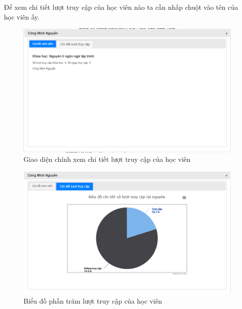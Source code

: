 \newpage
Để xem chi tiết lượt truy cập của học viên nào ta cần nhấp chuột vào tên của học viên ấy.

\begin{center}
	\begin{figure}[htp]
		\begin{center}
			\includegraphics[width=0.9\linewidth]{img/40}
		\end{center}
		\caption{Giao diện chính xem chi tiết lượt truy cập của học viên}
		\label{refhinh67}
	\end{figure}
\end{center}

\begin{center}
	\begin{figure}[htp]
		\begin{center}
			\includegraphics[width=0.9\linewidth]{img/41}
		\end{center}
		\caption{Biểu đồ phần trăm lượt truy cập của học viên}
		\label{refhinh68}
	\end{figure}
\end{center}

